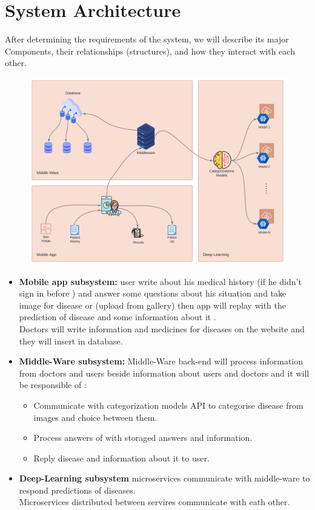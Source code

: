\section{System Architecture}
After determining the requirements of the system, we will describe its major 
Components, their relationships (structures), and how they interact with each
other.
\begin{figure}[!ht]
\centering
\includegraphics[width = 5.5in]{backmatter/figures/SysArch.png}
\end{figure}
\vspace{0.25cm}
\begin{itemize}
  \item \textbf{Mobile app subsystem:} user write about his medical history (if he didn’t sign in before ) and answer some questions about his situation and take image for disease or (upload from gallery) then app will replay with the prediction of disease and some information about it .\\Doctors will write information and medicines for diseases on the website and they will insert in database.\\
  \item \textbf{Middle-Ware subsystem:} Middle-Ware back-end will process information from doctors and users 
  beside information about users and doctors  and it will be responsible of 
  :\\
    \begin{itemize}
        \item Communicate with categorization models API to categorise disease from images and choice between them.\\
        \item Process answers of with storaged answers and information.\\
        \item Reply disease and information about it to user.\\
    \end{itemize}
  \item \textbf{Deep-Learning subsystem} microservices communicate with middle-ware to respond predictions of diseases.\\Microservices distributed between servires communicate with eath other.
\end{itemize}
